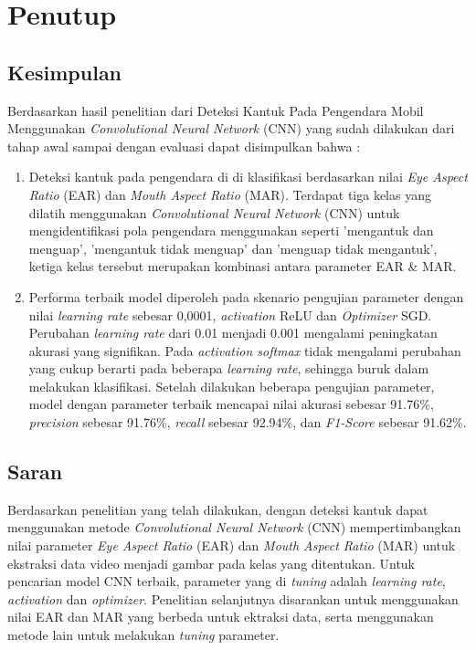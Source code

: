 \chapter{Penutup}

\section{Kesimpulan}

Berdasarkan hasil penelitian dari Deteksi Kantuk Pada Pengendara Mobil 
Menggunakan \textit{Convolutional Neural Network} (CNN) yang sudah 
dilakukan dari tahap awal sampai dengan evaluasi dapat disimpulkan bahwa : 

    \begin{enumerate}
        \item Deteksi kantuk pada pengendara di di klasifikasi berdasarkan nilai \textit{Eye Aspect Ratio} (EAR) dan \textit{Mouth Aspect Ratio} (MAR).
        Terdapat tiga kelas yang dilatih menggunakan \textit{Convolutional Neural Network} (CNN) untuk mengidentifikasi pola pengendara menggunakan seperti ’mengantuk dan menguap’, ’mengantuk tidak menguap’ dan ’menguap tidak mengantuk’, ketiga kelas tersebut merupakan kombinasi antara parameter EAR \& MAR.
        
        \item Performa terbaik model diperoleh pada skenario pengujian parameter dengan nilai \textit{learning rate} sebesar 0,0001, \textit{activation} ReLU dan \textit{Optimizer} SGD. Perubahan \textit{learning rate} dari 0.01 menjadi 0.001 mengalami peningkatan akurasi yang signifikan. Pada \textit{activation softmax} tidak mengalami perubahan yang cukup berarti pada beberapa \textit{learning rate}, sehingga buruk dalam melakukan klasifikasi. Setelah dilakukan beberapa pengujian parameter, model dengan parameter terbaik mencapai nilai akurasi 
        sebesar 91.76\%, \textit{precision} sebesar 91.76\%, \textit{recall} sebesar 92.94\%, dan \textit{F1-Score} sebesar 91.62\%.
    \end{enumerate}


\section{Saran}

Berdasarkan penelitian yang telah dilakukan, dengan deteksi kantuk dapat menggunakan metode \textit{Convolutional Neural Network} (CNN) mempertimbangkan nilai parameter \textit{Eye Aspect Ratio} (EAR) dan \textit{Mouth Aspect Ratio} (MAR) untuk ekstraksi data video menjadi gambar pada kelas yang ditentukan. Untuk pencarian model CNN terbaik, parameter yang di \textit{tuning} adalah \textit{learning rate}, \textit{activation} dan \textit{optimizer}. Penelitian selanjutnya disarankan untuk menggunakan nilai EAR dan MAR yang berbeda untuk ektraksi data, serta menggunakan metode lain untuk melakukan \textit{tuning} parameter.








